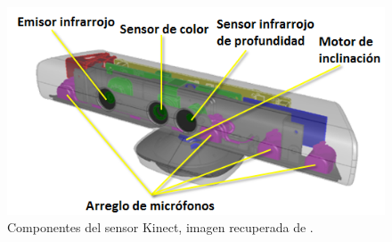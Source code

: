 \begin{figure}[h!]
\begin{center}
\includegraphics[scale=.6]{./Figures/sensor.png}
\end{center}
\caption{Componentes del sensor Kinect, imagen recuperada de \footnotemark{}.} 
\label{fig:KinectComponentes}
\end{figure}   


